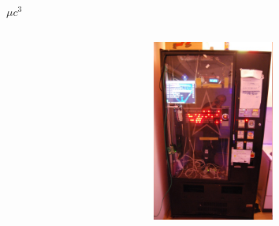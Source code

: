 \documentclass{beamer}
\begin{document}
\begin{frame}{$\mu c^{3}$}
\begin{columns}
\begin{column}{5cm}
      \end{column}
      \begin{column}{5cm}
        \begin{figure}
          \begin{center}
          \includegraphics[width=4cm]{bilder/matemat.jpg}
          \end{center}
        \end{figure}
      \end{column}
    \end{columns}
    \end{frame}
\end{document}
